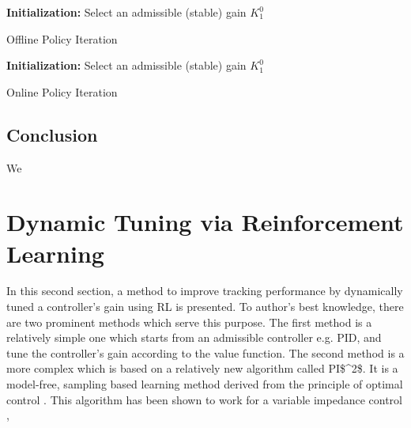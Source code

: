 \begin{algorithm}[H]
	\textbf{Initialization:} Select an admissible (stable) gain $K^0_1$\\
	\label{alg:off_pi}
	\caption{Offline Policy Iteration}
\end{algorithm}

\begin{algorithm}[H]
	\textbf{Initialization:} Select an admissible (stable) gain $K^0_1$\\
	\label{alg:on_pi}
	\caption{Online Policy Iteration}
\end{algorithm}


\subsection{Conclusion}
We

\section{Dynamic Tuning via Reinforcement Learning} \label{sec:dytun}
In this second section, a method to improve tracking performance by dynamically tuned a controller's gain using \ac {RL} is presented. To author's best knowledge, there are two prominent methods which serve this purpose. The first method is a relatively simple one \cite{Brujeni5669655} which starts from an admissible controller e.g. PID, and tune the controller's gain according to the value function. The second method is a more complex which is based on a relatively new algorithm called \ac {PI$^2$}. It is a model-free, sampling based learning method derived from the principle of optimal control \cite{Buchli2010}. This algorithm has been shown to work for a variable impedance control \cite{Buchli6037312}, 

